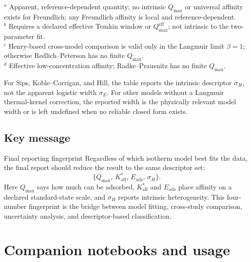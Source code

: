 \documentclass[journal=jacsat,manuscript=article]{achemso}
\begin{document}
\begin{table}[H]
	\smallskip

	\noindent $^{a}$ Apparent, reference-dependent quantity; no intrinsic
	$Q_{\max}$ or universal affinity exists for Freundlich; any Freundlich affinity is local and reference-dependent.\\
	\noindent $^{b}$ Requires a declared effective Temkin window or
	$Q_{\max}^{\mathrm{eff}}$; not intrinsic to the two-parameter fit.\\
	\noindent $^{c}$ Henry-based cross-model comparison is valid only in the
	Langmuir limit $\beta = 1$; otherwise Redlich--Peterson has no finite
	$Q_{\max}$.\\
	\noindent $^{d}$ Effective low-concentration affinity; Radke--Prausnitz has
	no finite $Q_{\max}$.

	\smallskip
	\noindent For Sips, Koble--Corrigan, and Hill, the table reports the
	intrinsic descriptor \(\sigma_H\), not the apparent logistic width
	\(\sigma_E\). For other models without a Langmuir thermal-kernel
	correction, the reported width is the physically relevant model width
	or is left undefined when no reliable closed form exists.
\end{table}

\subsection{Key message}
\label{sec:si_key_message}

\begin{greenbox}{Final reporting fingerprint}
	Regardless of which isotherm model best fits the data, the final report
	should reduce the result to the same descriptor set:
	\begin{equation}
		\{Q_{\max},\, K_{\mathrm{aff}}^{\ast},\,
		E_{\mathrm{ads}},\, \sigma_H\}.
	\end{equation}
	Here \(Q_{\max}\) says how much can be adsorbed,
	\(K_{\mathrm{aff}}^{\ast}\) and \(E_{\mathrm{ads}}\) place affinity on a
	declared standard-state scale, and \(\sigma_H\) reports intrinsic
	heterogeneity. This four-number fingerprint is the bridge between model
	fitting, cross-study comparison, uncertainty analysis, and
	descriptor-based classification.
\end{greenbox}

\section{Companion notebooks and usage}
\label{sec:si_notebooks}
\end{document}
